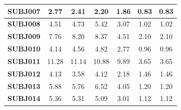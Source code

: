 \documentclass[idxtotoc,hyperref,openany]{labbook} %
\begin{document}
\begin{table}[]
\begin{tabular}{ccccccc}
		\multicolumn{1}{|c|}{\textbf{SUBJ007}}  & \multicolumn{1}{c|}{2.77}              & \multicolumn{1}{c|}{2.41}              & \multicolumn{1}{c|}{2.20}              & \multicolumn{1}{c|}{1.86}         & \multicolumn{1}{c|}{0.83}               & \multicolumn{1}{c|}{0.83}               \\ \hline
		\multicolumn{1}{|c|}{\textbf{SUBJ008}}  & \multicolumn{1}{c|}{4.51}              & \multicolumn{1}{c|}{4.73}              & \multicolumn{1}{c|}{5.42}              & \multicolumn{1}{c|}{3.07}         & \multicolumn{1}{c|}{1.02}               & \multicolumn{1}{c|}{1.02}               \\ \hline
		\multicolumn{1}{|c|}{\textbf{SUBJ009}}  & \multicolumn{1}{c|}{7.76}              & \multicolumn{1}{c|}{8.20}              & \multicolumn{1}{c|}{8.37}              & \multicolumn{1}{c|}{4.51}         & \multicolumn{1}{c|}{2.10}               & \multicolumn{1}{c|}{2.10}               \\ \hline
		\multicolumn{1}{|c|}{\textbf{SUBJ010}}  & \multicolumn{1}{c|}{4.14}              & \multicolumn{1}{c|}{4.56}              & \multicolumn{1}{c|}{4.82}              & \multicolumn{1}{c|}{2.77}         & \multicolumn{1}{c|}{0.96}               & \multicolumn{1}{c|}{0.96}               \\ \hline
		\multicolumn{1}{|c|}{\textbf{SUBJ011}}  & \multicolumn{1}{c|}{11.28}             & \multicolumn{1}{c|}{11.14}             & \multicolumn{1}{c|}{10.88}             & \multicolumn{1}{c|}{9.89}         & \multicolumn{1}{c|}{3.65}               & \multicolumn{1}{c|}{3.65}               \\ \hline
		\multicolumn{1}{|c|}{\textbf{SUBJ012}}  & \multicolumn{1}{c|}{4.13}              & \multicolumn{1}{c|}{3.58}              & \multicolumn{1}{c|}{4.12}              & \multicolumn{1}{c|}{2.18}         & \multicolumn{1}{c|}{1.46}               & \multicolumn{1}{c|}{1.46}               \\ \hline
		\multicolumn{1}{|c|}{\textbf{SUBJ013}}  & \multicolumn{1}{c|}{5.88}              & \multicolumn{1}{c|}{5.76}              & \multicolumn{1}{c|}{6.52}              & \multicolumn{1}{c|}{4.05}         & \multicolumn{1}{c|}{1.20}               & \multicolumn{1}{c|}{1.20}               \\ \hline
		\multicolumn{1}{|c|}{\textbf{SUBJ014}}  & \multicolumn{1}{c|}{5.36}              & \multicolumn{1}{c|}{5.31}              & \multicolumn{1}{c|}{5.09}              & \multicolumn{1}{c|}{3.01}         & \multicolumn{1}{c|}{1.12}               & \multicolumn{1}{c|}{1.12}               \\ \hline

\end{tabular}
\end{table}
\end{document}
